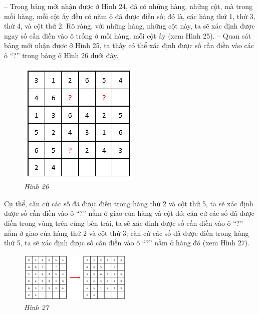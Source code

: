 	-- Trong bảng mới nhận được ở Hình 24, đã có những hàng, những cột, mà trong mỗi hàng, mỗi cột ấy đều có năm ô đã được điền số; đó là, các hàng thứ 1, thứ 3, thứ 4, và cột thứ 2. Rõ ràng, với những hàng, những cột này, ta sẽ xác định được ngay số cần điền vào ô trống ở mỗi hàng, mỗi cột ấy (xem Hình 25).
	\vskip 0.1cm
	-- Quan sát bảng mới nhận được ở Hình 25, ta thấy có thể xác định được số cần điền vào các ô “?” trong bảng ở Hình 26 dưới đây.
	\vskip 0.1cm
		\begin{figure}
		\centering
		\vspace*{-15pt}
		\captionsetup{labelformat= empty, justification=centering}
		\includegraphics[scale=0.64]{pic15}
		\vspace*{-5pt}
		\caption{\small\textit{Hình 26}}
		\vspace*{-10pt}
	\end{figure}
	Cụ thể, căn cứ các số đã được điền trong hàng thứ 2 và cột thứ 5, ta sẽ xác định được số cần điền vào ô “?” nằm ở giao của hàng và cột đó; căn cứ các số đã được điền trong vùng trên cùng  bên trái, ta sẽ xác định được số cần điền vào ô “?” nằm ở giao của hàng thứ 2 và cột thứ 3; căn cứ các số đã được điền trong hàng thứ 5, ta sẽ xác định được số cần điền vào ô “?” nằm ở hàng đó (xem Hình 27).
	\begin{figure}[H]
		\centering
		\vspace*{-10pt}
		\captionsetup{labelformat= empty, justification=centering}
		\includegraphics[width=0.48\textwidth]{pic16}
		\vspace*{-5pt}
		\caption{\small\textit{Hình 27}}
		\vspace*{-10pt}
	\end{figure}
